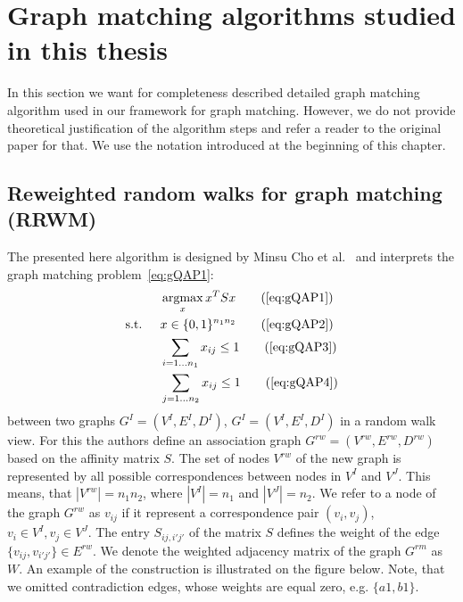 \section{Graph matching algorithms studied in this thesis}
In this section we want for completeness described detailed graph matching algorithm used in our framework for graph matching. However, we do not provide theoretical justification of the algorithm steps and refer a reader to the original paper for that. We use the notation introduced at the beginning of this chapter.

\subsection{Reweighted random walks for graph matching (RRWM)}
The presented here algorithm is designed by Minsu Cho et al.~\cite{Cho2010_RRWM} and interprets the graph matching problem~\eqref{eq:gQAP1}:
\begin{alignat*}{2}
    &     && \argmax_x{x^TSx}                           \tag{\ref{eq:gQAP1}}\\
    & \text{s.t. } &&  x\in \{0,1\}^{n_1n_2}            \tag{\ref{eq:gQAP2}}\\
    &             &&  \sum_{i=1\dots n_1} x_{ij}\le 1   \tag{\ref{eq:gQAP3}}\\
    &             &&  \sum_{j=1\dots n_2} x_{ij}\le 1   \tag{\ref{eq:gQAP4}}
\end{alignat*}
between two graphs $G^I=(V^I,E^I,D^I)$, $G^I=(V^I,E^I,D^I)$ in a random walk view. For this the authors define an association graph $G^{rw}=(V^{rw},E^{rw},D^{rw})$ based on the affinity matrix $S$. The set of nodes $V^{rw}$ of the new graph is represented by all possible correspondences between nodes in $V^I$ and $V^J$. This means, that $|V^{rw}|=n_1n_2$, where $|V^I|=n_1$ and $|V^J|=n_2$. We refer to a node of the graph $G^{rw}$ as $v_{ij}$ if it represent a correspondence pair $(v_i,v_j)$, $v_i\in V^I,v_j\in V^J$. The entry $S_{ij,i'j'}$ of the matrix $S$ defines the weight of the edge $\{v_{ij},v_{i'j'}\}\in E^{rw}$. We denote the weighted adjacency matrix of the graph $G^{rm}$ as $W$. An example of the construction is illustrated on the figure below. Note, that we omitted contradiction edges, whose weights are equal zero, e.g. $\{a1,b1\}$.

